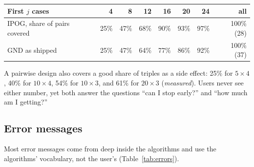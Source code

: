\documentclass[11pt]{article}
\begin{document}
\begin{center}\small
\begin{tabular}{@{}lrrrrrrr@{}}
\toprule
First $j$ cases & 4 & 8 & 12 & 16 & 20 & 24 & all \\
\midrule
IPOG, share of pairs covered & 25\% & 47\% & 68\% & 90\% & 93\% & 97\% & 100\% (28) \\
GND as shipped & 25\% & 47\% & 64\% & 77\% & 86\% & 92\% & 100\% (37) \\
\bottomrule
\end{tabular}
\end{center}

A pairwise design also covers a good share of triples as a side effect: 25\%
for $5\times4$, 40\% for $10\times4$, 54\% for $10\times3$, and 61\% for
$20\times3$ (\emph{measured}). Users never see either number, yet both
answer the questions ``can I stop early?'' and ``how much am I getting?''

\subsection{Error messages}\label{sec:ev-errors}

Most error messages come from deep inside the algorithms and use the
algorithms' vocabulary, not the user's (Table~\ref{tab:errors}).
\end{document}
